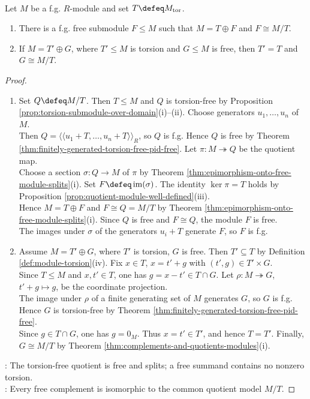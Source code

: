 \begin{theorem} \label{thm:finitely-generated-pid-free-plus-torsion} \\
Let $M$ be a f.g. $R$-module and set $T\defeq M_{\operatorname{tor}}$.
\begin{enumerate}[label=(\roman*)]
\setlength{\itemsep}{0pt}
\item There is a f.g. free submodule $F\leq M$ such that $M=T\oplus F$ and $F\cong M/T$.
\item If $M=T'\oplus G$, where $T'\leq M$ is torsion and $G\leq M$ is free, then $T'=T$ and $G\cong M/T$.
\end{enumerate}
\begin{proof}
\begin{enumerate}[label=(\roman*)]
\setlength{\itemsep}{0pt}
\item Set $Q\defeq M/T$. Then $T\leq M$ and $Q$ is torsion-free by Proposition \ref{prop:torsion-submodule-over-domain}(i)--(ii). Choose generators $u_1,\ldots,u_n$ of $M$.\\
Then $Q=\langle\!\langle u_1+T,\ldots,u_n+T\rangle\!\rangle_R$, so $Q$ is f.g. Hence $Q$ is free by Theorem \ref{thm:finitely-generated-torsion-free-pid-free}. Let $\pi:M\twoheadrightarrow Q$ be the quotient map.\\
Choose a section $\sigma:Q\to M$ of $\pi$ by Theorem \ref{thm:epimorphism-onto-free-module-splits}(i). Set $F\defeq\operatorname{im}(\sigma)$. The identity $\ker\pi=T$ holds by Proposition \ref{prop:quotient-module-well-defined}(iii).\\
Hence $M=T\oplus F$ and $F\cong Q=M/T$ by Theorem \ref{thm:epimorphism-onto-free-module-splits}(i). Since $Q$ is free and $F\cong Q$, the module $F$ is free.\\
The images under $\sigma$ of the generators $u_i+T$ generate $F$, so $F$ is f.g.
\item Assume $M=T'\oplus G$, where $T'$ is torsion, $G$ is free. Then $T'\subseteq T$ by Definition \ref{def:module-torsion}(iv). Fix $x\in T$, $x=t'+g$ with $(t',g)\in T'\times G$.\\
Since $T\leq M$ and $x,t'\in T$, one has $g=x-t'\in T\cap G$. Let $\rho:M\twoheadrightarrow G$, $t'+g\mapsto g$, be the coordinate projection.\\
The image under $\rho$ of a finite generating set of $M$ generates $G$, so $G$ is f.g. Hence $G$ is torsion-free by Theorem \ref{thm:finitely-generated-torsion-free-pid-free}.\\
Since $g\in T\cap G$, one has $g=0_M$. Thus $x=t'\in T'$, and hence $T=T'$. Finally, $G\cong M/T$ by Theorem \ref{thm:complements-and-quotients-modules}(i).
\end{enumerate}
\noindent
{}: The torsion-free quotient is free and splits; a free summand contains no nonzero torsion.\\
: Every free complement is isomorphic to the common quotient model $M/T$.
\end{proof}
\end{theorem}
